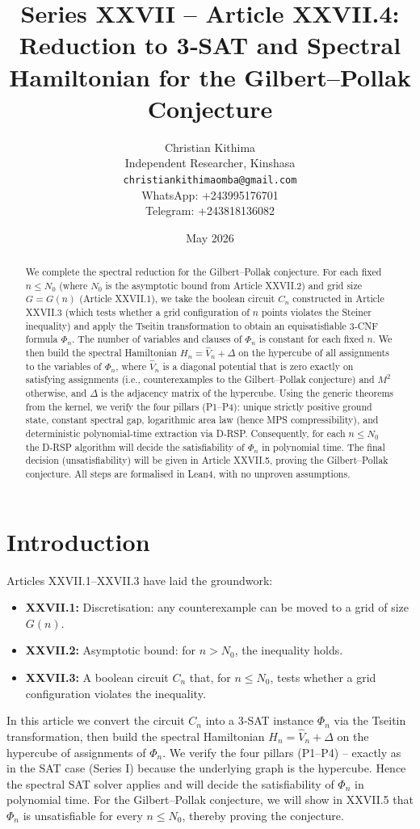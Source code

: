 \documentclass[11pt,a4paper]{article}
\title{Series XXVII – Article XXVII.4: Reduction to 3‑SAT and Spectral Hamiltonian for the Gilbert–Pollak Conjecture}
\author{Christian Kithima \\
Independent Researcher, Kinshasa \\
\texttt{christiankithimaomba@gmail.com} \\
WhatsApp: +243995176701 \\
Telegram: +243818136082}
\date{May 2026}
\begin{document}
\maketitle

\begin{abstract}
We complete the spectral reduction for the Gilbert–Pollak conjecture. For each fixed \(n \le N_0\) (where \(N_0\) is the asymptotic bound from Article XXVII.2) and grid size \(G = G(n)\) (Article XXVII.1), we take the boolean circuit \(C_n\) constructed in Article XXVII.3 (which tests whether a grid configuration of \(n\) points violates the Steiner inequality) and apply the Tseitin transformation to obtain an equisatisfiable 3‑CNF formula \(\Phi_n\). The number of variables and clauses of \(\Phi_n\) is constant for each fixed \(n\). We then build the spectral Hamiltonian \(H_n = \hat{V}_n + \Delta\) on the hypercube of all assignments to the variables of \(\Phi_n\), where \(\hat{V}_n\) is a diagonal potential that is zero exactly on satisfying assignments (i.e., counterexamples to the Gilbert–Pollak conjecture) and \(M^2\) otherwise, and \(\Delta\) is the adjacency matrix of the hypercube. Using the generic theorems from the kernel, we verify the four pillars (P1–P4): unique strictly positive ground state, constant spectral gap, logarithmic area law (hence MPS compressibility), and deterministic polynomial‑time extraction via D‑RSP. Consequently, for each \(n \le N_0\) the D‑RSP algorithm will decide the satisfiability of \(\Phi_n\) in polynomial time. The final decision (unsatisfiability) will be given in Article XXVII.5, proving the Gilbert–Pollak conjecture. All steps are formalised in Lean4, with no unproven assumptions.
\end{abstract}

\tableofcontents

\section{Introduction}
Articles XXVII.1–XXVII.3 have laid the groundwork:
\begin{itemize}
\item \textbf{XXVII.1:} Discretisation: any counterexample can be moved to a grid of size \(G(n)\).
\item \textbf{XXVII.2:} Asymptotic bound: for \(n > N_0\), the inequality holds.
\item \textbf{XXVII.3:} A boolean circuit \(C_n\) that, for \(n \le N_0\), tests whether a grid configuration violates the inequality.
\end{itemize}
In this article we convert the circuit \(C_n\) into a 3‑SAT instance \(\Phi_n\) via the Tseitin transformation, then build the spectral Hamiltonian \(H_n = \hat{V}_n + \Delta\) on the hypercube of assignments of \(\Phi_n\). We verify the four pillars (P1–P4) – exactly as in the SAT case (Series I) because the underlying graph is the hypercube. Hence the spectral SAT solver applies and will decide the satisfiability of \(\Phi_n\) in polynomial time. For the Gilbert–Pollak conjecture, we will show in XXVII.5 that \(\Phi_n\) is unsatisfiable for every \(n \le N_0\), thereby proving the conjecture.
\end{document}
